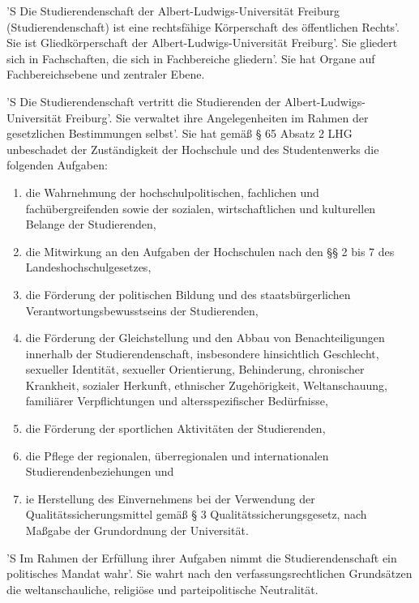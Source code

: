 \documentclass[fontsize=12pt,parskip=half]{scrartcl}
\begin{document}

\begin{contract}
  \label{Abs1:Stud}

  'S Die Studierendenschaft der Albert-Ludwigs-Universität Freiburg
  (Studierendenschaft) ist eine rechtsfähige Körperschaft des öffentlichen
  Rechts'. Sie ist Gliedkörperschaft der Albert-Ludwigs-Universität Freiburg'. Sie
  gliedert sich in Fachschaften, die sich in Fachbereiche gliedern'. Sie hat
  Organe auf Fachbereichsebene und zentraler Ebene. \label{Abs1:Stud.Beschreibung}

  'S Die Studierendenschaft vertritt die Studierenden der
  Albert-Ludwigs-Universität Freiburg'. Sie verwaltet ihre Angelegenheiten im
  Rahmen der gesetzlichen Bestimmungen selbst'. Sie hat gemäß § 65 Absatz 2 LHG
  unbeschadet der Zuständigkeit der Hochschule und des Studentenwerks die
  folgenden Aufgaben: \label{Abs1:Stud:Vertretung}
  \begin{enumerate}[\qquad 1.]
    \item die Wahrnehmung der hochschulpolitischen, fachlichen und
      fachübergreifenden sowie der sozialen, wirtschaftlichen und kulturellen
      Belange der Studierenden,
    \item die Mitwirkung an den Aufgaben der Hochschulen nach den §§ 2 bis 7
      des Landeshochschulgesetzes,
    \item die Förderung der politischen Bildung und des staatsbürgerlichen
      Verantwortungsbewusstseins der Studierenden,
    \item die Förderung der Gleichstellung und den Abbau von Benachteiligungen
      innerhalb der Studierendenschaft, insbesondere hinsichtlich Geschlecht,
      sexueller Identität, sexueller Orientierung, Behinderung, chronischer
      Krankheit, sozialer Herkunft, ethnischer Zugehörigkeit, Weltanschauung,
      familiärer Verpflichtungen und altersspezifischer Bedürfnisse,
    \item die Förderung der sportlichen Aktivitäten der Studierenden,
    \item die Pflege der regionalen, überregionalen und internationalen
      Studierendenbeziehungen und
    \item ie Herstellung des Einvernehmens bei der Verwendung der
      Qualitätssicherungsmittel gemäß § 3 Qualitätssicherungsgesetz, nach
      Maßgabe der Grundordnung der Universität.
  \end{enumerate}
  \label{Abs1:Stud.polMan}
  'S Im Rahmen der Erfüllung ihrer Aufgaben nimmt die Studierendenschaft ein
  politisches Mandat wahr'. Sie wahrt nach den verfassungsrechtlichen Grundsätzen
  die weltanschauliche, religiöse und parteipolitische Neutralität.


\end{contract}
\end{document}
